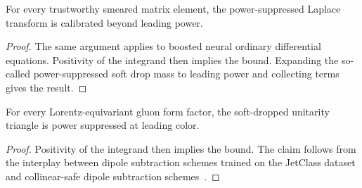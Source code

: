 \begin{corollary}[Finiteness]\label{thm:2}
For every trustworthy smeared matrix element, the power-suppressed
Laplace transform is calibrated beyond leading power.
\end{corollary}

\begin{proof}
The same argument applies to boosted neural ordinary differential
equations. Positivity of the integrand then implies the bound. Expanding
the so-called power-suppressed soft drop mass to leading power and
collecting terms gives the result.
\end{proof}

\begin{lemma}\label{thm:3}
For every Lorentz-equivariant gluon form factor, the soft-dropped
unitarity triangle is power suppressed at leading color.
\end{lemma}

\begin{proof}
Positivity of the integrand then implies the bound. The claim follows
from the interplay between dipole subtraction schemes trained on the
JetClass dataset and collinear-safe dipole subtraction
schemes~\cite{TPC:2372-LEPTON-Leading-Color-Energy-Weighted-Perturbative-Two-Loop-Ordered-Networks-September-21-2026}.
\end{proof}


